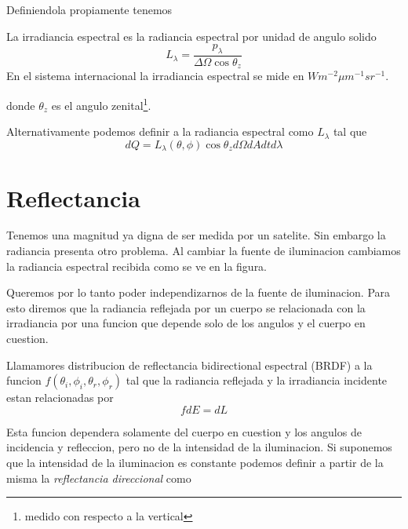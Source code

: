Definiendola propiamente tenemos

\begin{dex}
  La irradiancia espectral es la radiancia espectral por unidad de angulo solido
  \begin{equation}
    L_\lambda = \frac{p_\lambda}{\Delta \Omega \cos \theta_z}
  \end{equation}
  En el sistema internacional la irradiancia espectral se mide en $W m^{-2} \mu
  m^{-1} sr^{-1}$.
\end{dex}

donde $\theta_z$ es el angulo zenital\footnote{medido con respecto a la
vertical}.

\begin{obs}
  Alternativamente podemos definir a la radiancia espectral como $L_\lambda$ tal
  que
  \begin{equation}
    dQ = L_\lambda(\theta,\phi) \cos \theta_z d\Omega dA dt d\lambda
  \end{equation}
\end{obs}

\section{Reflectancia}
Tenemos una magnitud ya digna de ser medida por un satelite. Sin embargo la
radiancia presenta otro problema. Al cambiar la fuente de iluminacion cambiamos
la radiancia espectral recibida como se ve en la figura.

Queremos por lo tanto poder independizarnos de la fuente de iluminacion. Para
esto diremos que la radiancia reflejada por un cuerpo se relacionada con la
irradiancia por una funcion que depende solo de los angulos y el cuerpo en
cuestion.

\begin{dex}
  Llamamores distribucion de reflectancia bidirectional espectral (BRDF) a la
  funcion $f(\theta_i, \phi_i, \theta_r, \phi_r)$ tal que la radiancia reflejada
  y la irradiancia incidente estan relacionadas por
  \begin{equation}
    f dE = dL
  \end{equation}
\end{dex}

Esta funcion dependera solamente del cuerpo en cuestion y los angulos de
incidencia y refleccion, pero no de la intensidad de la iluminacion. Si
suponemos que la intensidad de la iluminacion es constante podemos definir a
partir de la misma la \emph{reflectancia direccional} como

